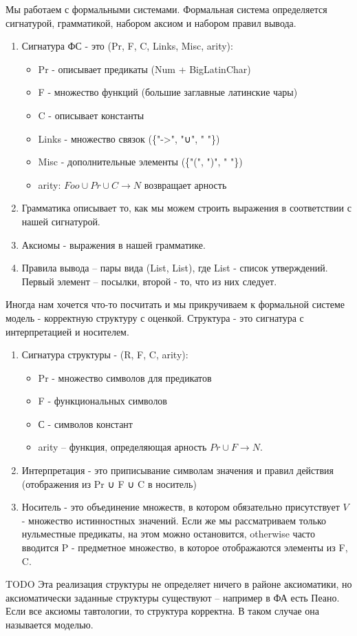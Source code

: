 \documentclass[12pt]{article}
\begin{document}
Мы работаем с формальными системами.
Формальная система определяется сигнатурой, грамматикой,
набором аксиом и набором правил вывода.
\begin{enumerate}
\item Сигнатура ФС - это (Pr, F, C, Links, Misc, arity):
\begin{itemize}
\item Pr - описывает предикаты (Num + BigLatinChar)
\item F - множество функций (большие заглавные латинские чары)
\item C - описывает константы
\item Links - множество связок (\{"->", "∪", " "\})
\item Misc - дополнительные элементы (\{"(", ")", " "\})
\item arity: $Foo ∪ Pr ∪ C \to N$ возвращает арность
\end{itemize}
\item Грамматика описывает то, как мы можем строить выражения
в соответствии с нашей сигнатурой.
\item Аксиомы - выражения в нашей грамматике.
\item Правила вывода – пары вида (List, List), где List -
список утверждений. Первый элемент – посылки, второй -
то, что из них следует.
\end{enumerate}

Иногда нам хочется что-то посчитать и мы прикручиваем к
формальной системе модель - корректную структуру с оценкой.
Структура - это сигнатура с интерпретацией и носителем.
\begin{enumerate}
\item Сигнатура структуры - (R, F, C, arity):
\begin{itemize}
\item Pr - множество символов для предикатов
\item F - функциональных символов
\item С - символов констант
\item arity – функция, определяющая арность $Pr ∪ F \to N$.
\end{itemize}
\item Интерпретация - это приписывание символам значения
и правил действия (отображения из Pr ∪ F ∪ C в носитель)
\item Носитель - это объединение множеств, в котором обязательно
присутствует $V$ - множество истинностных значений. Если же
мы рассматриваем только нульместные предикаты, на этом
можно остановится, otherwise часто вводится P - предметное
множество, в которое отображаются элементы из F, C.
\end{enumerate}
TODO Эта реализация структуры не определяет ничего в районе
аксиоматики, но аксиоматически заданные структуры существуют
– например в ФА есть Пеано.
Если все аксиомы тавтологии, то структура корректна.
В таком случае она называется моделью.
\end{document}
